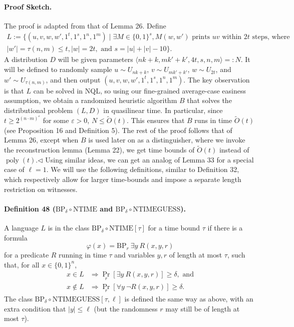 \paragraph{Proof Sketch.} The proof is adapted from that of Lemma 26. Define
\begin{multline*}
L:=\{(u,v,w,w',1^t,1^s,1^n,1^m)\mid\exists M\in\{0,1\}^s,M(w,w')\text{ prints }uv\text{ within }2t\text{ steps, where}\\
|w'|=\tau(n,m)\leq t,|w|=2t,\text{ and }s=|u|+|v|-10\}.
\end{multline*}
A distribution $D$ will be given parameters $\langle nk+k,mk'+k',4t,s,n,m\rangle=:N$. It will be defined to randomly sample $u\sim U_{nk+k}$, $v\sim U_{mk'+k'}$, $w\sim U_{2t}$, and $w'\sim U_{\tau(n,m)}$, and then output $(u,v,w,w',1^t,1^s,1^n,1^m)$.
The key observation is that $L$ can be solved in NQL, so using our fine-grained average-case easiness assumption, we obtain a randomized heuristic algorithm $B$ that solves the distributional problem $(L,D)$ in quasilinear time. In particular, since $t\geq2^{(n\cdot m)^\varepsilon}$ for some $\varepsilon>0$, $N\leq\widetilde O(t)$. This ensures that $B$ runs in time $\widetilde O(t)$ (see Proposition 16 and Definition 5).
The rest of the proof follows that of Lemma 26, except when $B$ is used later on as a distinguisher, where we invoke the reconstruction lemma (Lemma 22), we get time bounds of $\widetilde O(t)$ instead of $\operatorname{poly}(t)$.\hfill$\triangleleft$
Using similar ideas, we can get an analog of Lemma 33 for a special case of $\ell=1$. We will use the following definitions, similar to Definition 32, which respectively allow for larger time-bounds and impose a separate length restriction on witnesses.
\paragraph{Definition 48 ($\mathrm{BP}_\delta\circ\mathrm{NTIME}$ and $\mathrm{BP}_\delta\circ\mathrm{NTIMEGUESS}$).} A language $L$ is in the class $\mathrm{BP}_\delta\circ\mathrm{NTIME}[\tau]$ for a time bound $\tau$ if there is a formula
\[\varphi(x)=\mathrm{BP}_r\ \exists y\ R(x,y,r)\]
for a predicate $R$ running in time $\tau$ and variables $y,r$ of length at most $\tau$, such that, for all $x\in\{0,1\}^n$,
\begin{align*}
x\in L&\Longrightarrow\Pr_r[\exists y\ R(x,y,r)]\geq\delta,\text{ and}\\
x\notin L&\Longrightarrow\Pr_r[\forall y\ \neg R(x,y,r)]\geq\delta.
\end{align*}
The class $\mathrm{BP}_\delta\circ\mathrm{NTIMEGUESS}[\tau,\ell]$ is defined the same way as above, with an extra condition that $|y|\leq\ell$ (but the randomness $r$ may still be of length at most $\tau$).
